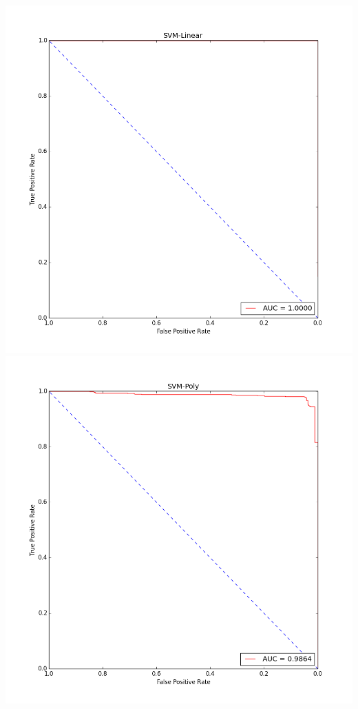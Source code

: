 \documentclass[fleqn]{article}
\begin{document}
    \begin{center}
        \includegraphics[scale=0.2]{roc_SVM-Linear.png}
        \includegraphics[scale=0.2]{roc_SVM-Poly.png}

\end{center}
\end{document}
